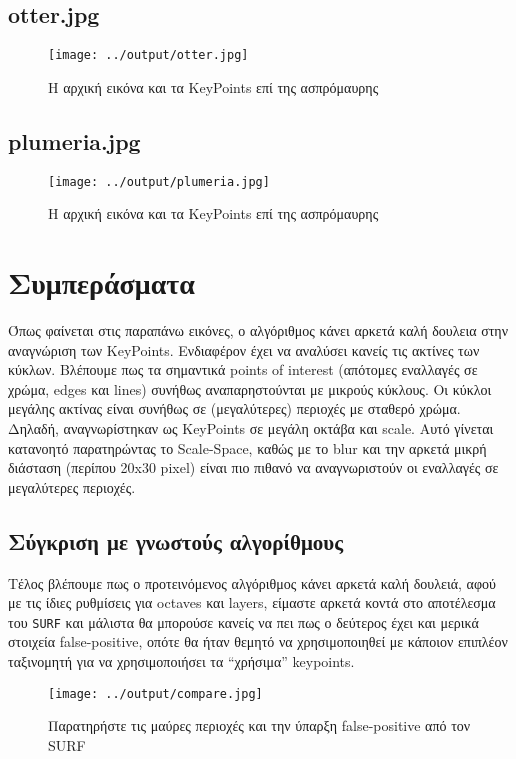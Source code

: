 \documentclass[11pt]{scrartcl} %
\begin{document}
\subsection{otter.jpg}
\begin{figure}[H]
  \centerline{\texttt{[image: ../output/otter.jpg]}}
  \caption{H αρχική εικόνα και τα KeyPoints επί της ασπρόμαυρης}
\end{figure}

\subsection{plumeria.jpg}
\begin{figure}[H]
  \centerline{\texttt{[image: ../output/plumeria.jpg]}}
  \caption{H αρχική εικόνα και τα KeyPoints επί της ασπρόμαυρης}
\end{figure}

\section{Συμπεράσματα}

Όπως φαίνεται στις παραπάνω εικόνες, ο αλγόριθμος κάνει αρκετά καλή δουλεια στην αναγνώριση των KeyPoints.
Ενδιαφέρον έχει να αναλύσει κανείς τις ακτίνες των κύκλων. Βλέπουμε πως τα σημαντικά points of interest
(απότομες εναλλαγές σε χρώμα, edges και lines) συνήθως αναπαρηστούνται με μικρούς κύκλους.
Οι κύκλοι μεγάλης ακτίνας είναι συνήθως σε (μεγαλύτερες) περιοχές με σταθερό χρώμα. Δηλαδή, αναγνωρίστηκαν ως
KeyPoints σε μεγάλη οκτάβα και scale. Aυτό γίνεται κατανοητό παρατηρώντας το Scale-Space, καθώς με το
blur και την αρκετά μικρή διάσταση (περίπου 20x30 pixel) είναι πιο πιθανό να αναγνωριστούν
οι εναλλαγές σε μεγαλύτερες περιοχές.

\subsection{Σύγκριση με γνωστούς αλγορίθμους}
Τέλος βλέπουμε πως ο προτεινόμενος αλγόριθμος κάνει αρκετά καλή δουλειά, αφού με τις ίδιες ρυθμίσεις για
octaves και layers, είμαστε αρκετά κοντά στο αποτέλεσμα του \texttt{SURF} και μάλιστα θα μπορούσε κανείς
να πει πως ο δεύτερος έχει και μερικά στοιχεία false-positive, οπότε θα ήταν θεμητό να χρησιμοποιηθεί με
κάποιον επιπλέον ταξινομητή για να χρησιμοποιήσει τα ``χρήσιμα'' keypoints.

\begin{figure}[H]
  \centerline{\texttt{[image: ../output/compare.jpg]}}
  \caption{Παρατηρήστε τις μαύρες περιοχές και την ύπαρξη false-positive από τον SURF}
\end{figure}
\end{document}
